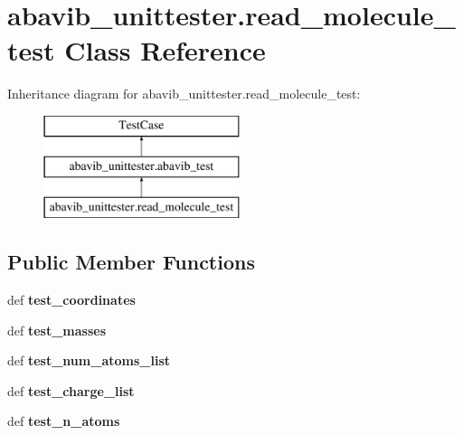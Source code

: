 \hypertarget{classabavib__unittester_1_1read__molecule__test}{\section{abavib\+\_\+unittester.\+read\+\_\+molecule\+\_\+test Class Reference}
\label{classabavib__unittester_1_1read__molecule__test}
}
Inheritance diagram for abavib\+\_\+unittester.\+read\+\_\+molecule\+\_\+test\+:\begin{figure}[H]
\begin{center}
\leavevmode
\includegraphics[height=3.000000cm]{classabavib__unittester_1_1read__molecule__test}
\end{center}
\end{figure}
\subsection*{Public Member Functions}
\begin{DoxyCompactItemize}
\item 
\hypertarget{classabavib__unittester_1_1read__molecule__test_ab2944b667d4d096a4386c89cb8a7c44a}{def {\bfseries test\+\_\+coordinates}}\label{classabavib__unittester_1_1read__molecule__test_ab2944b667d4d096a4386c89cb8a7c44a}

\item 
\hypertarget{classabavib__unittester_1_1read__molecule__test_a63546c5c77b2b10fa3ebc0efa30cc9a6}{def {\bfseries test\+\_\+masses}}\label{classabavib__unittester_1_1read__molecule__test_a63546c5c77b2b10fa3ebc0efa30cc9a6}

\item 
\hypertarget{classabavib__unittester_1_1read__molecule__test_a64f2177206444f824938a18b54fe3636}{def {\bfseries test\+\_\+num\+\_\+atoms\+\_\+list}}\label{classabavib__unittester_1_1read__molecule__test_a64f2177206444f824938a18b54fe3636}

\item 
\hypertarget{classabavib__unittester_1_1read__molecule__test_a0642a77c8a56affe42489a7c554754ba}{def {\bfseries test\+\_\+charge\+\_\+list}}\label{classabavib__unittester_1_1read__molecule__test_a0642a77c8a56affe42489a7c554754ba}

\item 
\hypertarget{classabavib__unittester_1_1read__molecule__test_a1e1c510c35f2316280baac8e6c1c3ebc}{def {\bfseries test\+\_\+n\+\_\+atoms}}\label{classabavib__unittester_1_1read__molecule__test_a1e1c510c35f2316280baac8e6c1c3ebc}

\end{DoxyCompactItemize}
